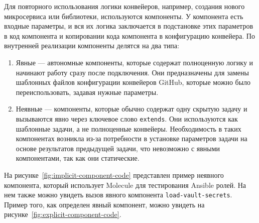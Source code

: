 Для повторного использования логики конвейеров, например, создания нового микросервиса или библиотеки, используются компоненты.
У компонента есть входные параметры, и вся их логика заключается в подстановке этих параметров в код компонента и копировании кода компонента в конфигурацию конвейера.
По внутренней реализации компоненты делятся на два типа:
\begin{enumerate}
  \item Явные — автономные компоненты, которые содержат полноценную логику и начинают работу сразу после подключения.
  Они предназначены для замены шаблонных файлов конфигурации конвейеров GitHub, которые можно было переиспользовать, задавая нужные параметры.
  \item Неявные — компоненты, которые обычно содержат одну скрытую задачу и вызываются явно через ключевое слово \texttt{extends}.
  Они используются как шаблонные задачи, а не полноценные конвейеры.
  Необходимость в таких компонентах возникла из-за потребности в установке параметров задачи на основе результатов предыдущей задачи, что невозможно с явными компонентами, так как они статические.
\end{enumerate}

На рисунке~\ref{fig:implicit-component-code} представлен пример неявного компонента, который использует Molecule для тестирования Ansible ролей.
На нем также можно увидеть вызов явного компонента \texttt{load-vault-secrets}.
Пример того, как определен явный компонент, можно увидеть на рисунке~\ref{fig:explicit-component-code}.

